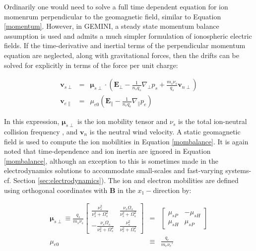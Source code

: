 \documentclass[11pt,letterpaper]{article}
\begin{document}
Ordinarily one would need to solve a full time dependent equation for ion momenrum perpendicular to the geomagnetic field, similar to Equation \ref{momentum}.  However, in GEMINI, a steady state momentum balance assumption is used and admits a much simpler formulation of ionospheric electric fields.  If the time-derivative and inertial terms of the perpendicular momentum equation are neglected, along with gravitational forces, then the drifts can be solved for explicitly in terms of the force per unit charge:
\begin{linenomath*} \begin{eqnarray}
\mathbf{v}_{s\perp} &=& \boldsymbol{\mu}_{s\perp} \cdot \left( \mathbf{E}_\perp - \frac{1}{n_s q_s} \nabla_\perp p_s + \frac{m_s \nu_s}{q_s} \mathbf{v}_{n\perp} \right) \label{mombalance} \\
\mathbf{v}_{e\parallel} &=& \mu_{e0} \left( \mathbf{E}_\parallel - \frac{1}{n_e q_e} \nabla_\parallel p_e \right) \label{mombalancepar}
\end{eqnarray} \end{linenomath*}
In this expression, $\boldsymbol{\mu}_{s\perp}$ is the ion mobility tensor and $\nu_s$ is the total ion-neutral collision frequency \citep{Zettergren:2012}, and $\mathbf{v}_n$ is the neutral wind velocity. A static geomagnetic field is used to compute the ion mobilities in Equation \ref{mombalance}.  It is again noted that time-dependence and ion inertia are ignored in Equation \ref{mombalance}, although an exception to this is sometimes made in the electrodynamics solutions to accommodate small-scales and fast-varying systems- cf. Section \ref{sec:electrodynamics}).  The ion and electron mobilities are defined using orthogonal coordinates with $\mathbf{B}$ in the $x_1-$direction by:
\begin{linenomath*} \begin{eqnarray}
\boldsymbol{\mu}_{s\perp}
\equiv
\frac{q_s}{m_s \nu_s}  \left[ \begin{array}{cc}
  \frac{\nu_{s}^2}{\nu_{s}^2 + \Omega_s^2} & \frac{\nu_{s} \Omega_s}{\nu_{s}^2+\Omega_s^2} \\
  - \frac{\nu_{s} \Omega_s}{\nu_{s}^2+\Omega_s^2} &  \frac{\nu_{s}^2}{\nu_{s}^2 + \Omega_s^2}
\end{array} \right]
&=&
\left[ \begin{array}{cc}
  \mu_{sP} & -\mu_{sH} \\
  \mu_{sH} &  \mu_{sP}
\end{array} \right]
\label{mus} \\
\mu_{e0} & \equiv & \frac{q_e}{m_e \nu_e'}
\end{eqnarray} \end{linenomath*}
\end{document}
